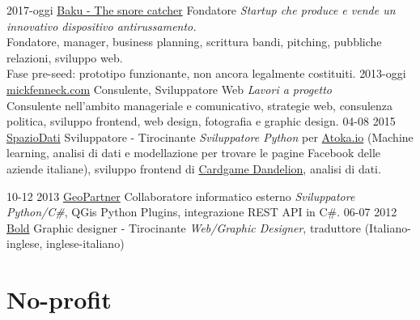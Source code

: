 \documentclass[]{friggeri-cv}
\begin{document}
\begin{entrylist}
\entry
    {2017-oggi}
    {\href{http://snorecatcher.it/it/benvenuti.html}{Baku - The snore catcher}}
    {Fondatore}
    {\emph{Startup che produce e vende un innovativo dispositivo antirussamento.}\\
    {Fondatore, manager, business planning, scrittura bandi, pitching, pubbliche relazioni, sviluppo web.\\
    Fase pre-seed: prototipo funzionante, non ancora legalmente costituiti.}
    }
\entry
    {2013-oggi}
    {\href{http://www.mickfenneck.com}{mickfenneck.com}}
    {Consulente, Sviluppatore Web}
    {\emph{Lavori a progetto}\\
    {Consulente nell'ambito manageriale e comunicativo, strategie web, consulenza politica, sviluppo frontend, web design, fotografia e graphic design.}
    }
\entry
    {04-08 2015}
    {\href{https://spaziodati.eu/en/}{SpazioDati}}
    {Sviluppatore - Tirocinante}
    {\emph{Sviluppatore Python} per \href{https://atoka.io/en/}{Atoka.io} (Machine learning, analisi di dati e modellazione per trovare le pagine Facebook delle aziende italiane), sviluppo frontend di \href{http://cardgame.dandelion.eu}{Cardgame Dandelion}, analisi di dati.
    }
\end{entrylist}
\begin{entrylist}
\entry
    {10-12 2013}
    {\href{http://www.geopartner.it}{GeoPartner}}
    {Collaboratore informatico esterno}
    {\emph{Sviluppatore Python/C\#}, QGis Python Plugins, integrazione REST API in C\#.}
\entry
    {06-07 2012}
    {\href{http://www.studiobold.it}{Bold}}
    {Graphic designer - Tirocinante}
    {\emph{Web/Graphic Designer}, traduttore (Italiano-inglese, inglese-italiano)}
\end{entrylist}



\section{No-profit}
\end{document}
